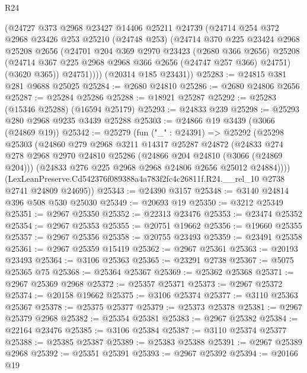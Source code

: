 \begin{lexlean}{R24}
\begin{coremodule}
        (@24727
          @373
          @2968
          @23427
          @14406
          @25211
          @24739
          (@24714
            @254
            @372
            @2968
            @23426
            @253
            @25210
            (@24748 @253)
            (@24714
              @370
              @225
              @23424
              @2968
              @25208
              @2656
              (@24701
                @204
                @369
                @2970
                @23423
                (@2680 @366 @2656)
                @25208
                (@24714 @367 @225 @2968 @2968 @366 @2656 (@24747 @257 @366) @24751)
                (@3620 @365))
              @24751))))
      (@20314 @185 @23431))
@25283 := @24815 @381 @281 @9688 @25025
@25284 := @2680 @24810
@25286 := @2680 @24806 @2656
@25287 := @25284 @25286
@25288 := @18921 @25287
@25292 := @25283 (@15346 @25288) (@16594 @25179)
@25293 := @24833 @239
@25298 := @25293 @280 @2968 @9235 @3439 @25288
@25303 := @24866 @19 @3439 (@3066 (@24869 @19))
@25342 := @25279
    (fun ("_" : @24391) =>
    @25292
      (@25298
        @25303
        (@24860
          @279
          @2968
          @3211
          @14317
          @25287
          @24872
          (@24833
            @274
            @278
            @2968
            @2970
            @24810
            @25286
            (@24866 @204 @24810 (@3066 (@24869 @204)))
            (@24833 @276 @225 @2968 @2968 @24806 @2656 @25012 @24884))))
      (LexLeanPreserve.Cd542376f089388a4a783f2fc4c26811f.R24.__rel_10 @2738 @2741 @24809 @24695))
@25343 := @24390 @3157
@25348 := @3140 @24814 @396 @508 @530 @25030
@25349 := @20693 @19
@25350 := @3212 @25349
@25351 := @2967 @25350
@25352 := @22313 @23476
@25353 := @23474 @25352
@25354 := @2967 @25353
@25355 := @20751 @19662
@25356 := @19660 @25355
@25357 := @2967 @25356
@25358 := @20755 @23493
@25359 := @23491 @25358
@25361 := @2967 @25359 @15419
@25362 := @2967 @25361
@25363 := @20193 @23493
@25364 := @3106 @25363
@25365 := @23291 @2738
@25367 := @5075 @25365 @75
@25368 := @25364 @25367
@25369 := @25362 @25368
@25371 := @2967 @25369 @2968
@25372 := @25357 @25371
@25373 := @2967 @25372
@25374 := @20158 @19662
@25375 := @3106 @25374
@25377 := @3110 @25363 @25367
@25378 := @25375 @25377
@25379 := @25373 @25378
@25381 := @2967 @25379 @2968
@25382 := @25354 @25381
@25383 := @2967 @25382
@25384 := @22164 @23476
@25385 := @3106 @25384
@25387 := @3110 @25374 @25377
@25388 := @25385 @25387
@25389 := @25383 @25388
@25391 := @2967 @25389 @2968
@25392 := @25351 @25391
@25393 := @2967 @25392
@25394 := @20166 @19

\end{coremodule}
\end{lexlean}
